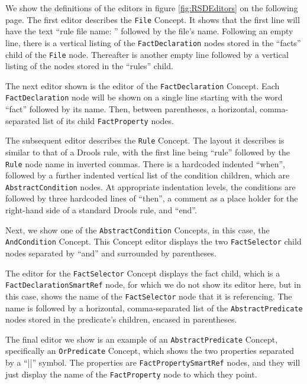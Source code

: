 We show the definitions of the editors in figure \ref{fig:RSDEditors} on the following page. 
The first editor describes the \texttt{File} Concept. 
It shows that the first line will have the text ``rule file name: '' followed by the file's name.
Following an empty line, there is a vertical listing of the \texttt{FactDeclaration} nodes stored in the ``facts'' child of the \texttt{File} node.
Thereafter is another empty line followed by a vertical listing of the  nodes stored in the ``rules'' child.

The next editor shown is the editor of the \texttt{FactDeclaration} Concept.
Each \texttt{FactDeclaration} node will be shown on a single line starting with the word ``fact'' followed by its name.
Then, between parentheses, a horizontal, comma-separated list of its child \texttt{FactProperty} nodes.

The subsequent editor describes the \texttt{Rule} Concept. 
The layout it describes is similar to that of a Drools rule, with the first line being ``rule'' followed by the \texttt{Rule} node name in inverted commas.
There is a hardcoded indented ``when'', followed by a further indented vertical list of the condition children, which are \texttt{AbstractCondition} nodes.
At appropriate indentation levels, the conditions are followed by three hardcoded lines of ``then'', a comment as a place holder for the right-hand side of a standard Drools rule, and ``end''.

Next, we show one of the \texttt{AbstractCondition} Concepts, in this case, the \texttt{AndCondition} Concept.
This Concept editor displays the two \texttt{FactSelector} child nodes separated by ``and'' and surrounded by parentheses.

The editor for the \texttt{FactSelector} Concept displays the fact child, which is a \texttt{FactDeclarationSmartRef} node, for which we do not show its editor here, but in this case, shows the name of the \texttt{FactSelector} node that it is referencing.
The name is followed by a horizontal, comma-separated list of the \texttt{AbstractPredicate} nodes stored in the predicate's children, encased in parentheses.

The final editor we show is an example of an \texttt{AbstractPredicate} Concept, specifically an \texttt{OrPredicate} Concept, which shows the two properties separated by a ``||'' symbol.
The properties are \texttt{FactPropertySmartRef} nodes, and they will just display the name of the \texttt{FactProperty} node to which they point.

